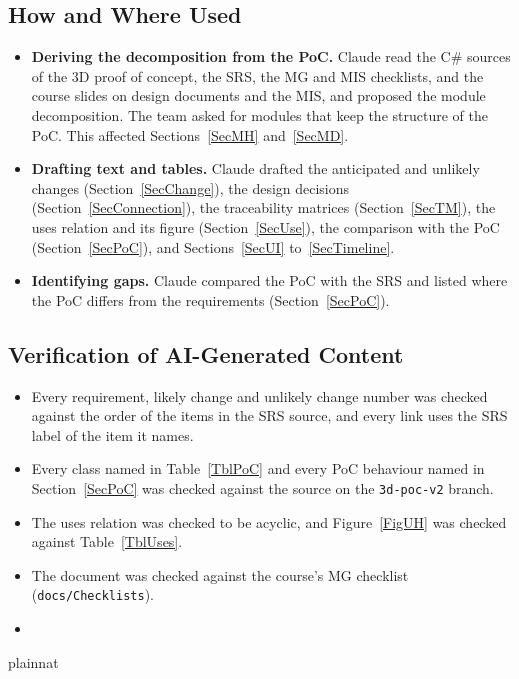 \documentclass[12pt, titlepage]{article}
\begin{document}
\subsection{How and Where Used}

\begin{itemize}
\item \textbf{Deriving the decomposition from the PoC.} Claude read the C\#
  sources of the 3D proof of concept, the SRS, the MG and MIS checklists, and
  the course slides on design documents and the MIS, and proposed the
  module decomposition. The team asked for modules that keep the structure
  of the PoC. This affected Sections~\ref{SecMH} and~\ref{SecMD}.
\item \textbf{Drafting text and tables.} Claude drafted the anticipated and
  unlikely changes (Section~\ref{SecChange}), the design decisions
  (Section~\ref{SecConnection}), the traceability matrices
  (Section~\ref{SecTM}), the uses relation and its figure
  (Section~\ref{SecUse}), the comparison with the PoC (Section~\ref{SecPoC}),
  and Sections~\ref{SecUI} to~\ref{SecTimeline}.
\item \textbf{Identifying gaps.} Claude compared the PoC with the SRS and
  listed where the PoC differs from the requirements (Section~\ref{SecPoC}).
\end{itemize}

\subsection{Verification of AI-Generated Content}

\begin{itemize}
\item Every requirement, likely change and unlikely change number was checked
  against the order of the items in the SRS source, and every link uses the
  SRS label of the item it names.
\item Every class named in Table~\ref{TblPoC} and every PoC behaviour named in
  Section~\ref{SecPoC} was checked against the source on the \texttt{3d-poc-v2}
  branch.
\item The uses relation was checked to be acyclic, and Figure~\ref{FigUH} was
  checked against Table~\ref{TblUses}.
\item The document was checked against the course's MG checklist
  (\texttt{docs/Checklists}).
\item {}
\end{itemize}

\newpage{}

 {plainnat}

\end{document}
